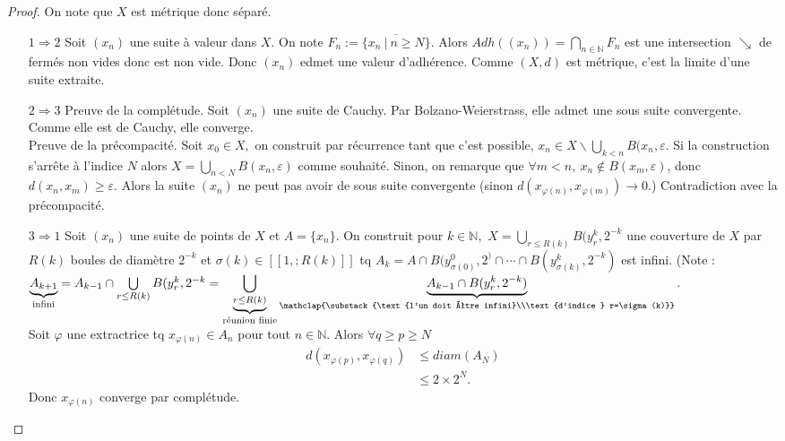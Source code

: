 \begin{proof}
    On note que $X$ est métrique donc séparé.
    \begin{itemize}
    \item[$1\Rightarrow 2$] Soit $(x_n)$ une suite à valeur dans $X.$ On note $F_n:=\overline{\{x_n\ |\ n\ge N\}} $. Alors $Adh((x_n))=\bigcap\limits_{n\in \mathbb{N} } F_n$ est une intersection $\searrow$ de fermés non vides donc est non vide. Donc $(x_{n})$ edmet une valeur d'adhérence. Comme $(X,d)$ est métrique, c'est la limite d'une suite extraite.
    \item[ $2\Rightarrow 3$] Preuve de la complétude. Soit $(x_{n})$ une suite de Cauchy. Par Bolzano-Weierstrass, elle admet une sous suite convergente. Comme elle est de Cauchy, elle converge.\\
        Preuve de la précompacité. Soit $x_0\in X,$ on construit par récurrence tant que c'est possible, $x_{n}\in X\backslash \bigcup\limits_{k<n} B(x_{n},\varepsilon $. Si la construction s'arrête à l'indice $N$ alors $X=\bigcup\limits_{n<N} B(x_{n},\varepsilon )$ comme souhaité. Sinon, on remarque que $\forall m<n,\ x_{n}\not\in B(x_m,\varepsilon ) $, donc $d(x_{n},x_m)\ge \varepsilon .$ Alors la suite $(x_{n})$ ne peut pas avoir de sous suite convergente (sinon $d(x _{\varphi (n)},x_{\varphi (m)})\to 0.$) Contradiction avec la précompacité.
    \item[$3\Rightarrow 1$] Soit $(x_{n})$ une suite de points de $X$ et $A=\{x_{n}\} $. On construit pour  $k\in \mathbb{N} ,$ $X=\bigcup\limits_{r\le R(k)} B(y_r^k,2^{-k}$ une couverture de $X$ par $R(k)$ boules de diamètre $2^{-k}$ et $\sigma(k)\in [\![1,;R(k)]\!]$ tq $A_k=A\cap B(y^0_{\sigma(0)},2^ ) \cap \cdots\cap B(y^k_{\sigma(k)},2^{-k})$ est infini. (Note : $\underbrace{A_{k+1}}_{\text{infini}}=A_{k-1}\cap \bigcup\limits_{r\le R(k)} B(y^k_r,2^{-k}=\underbrace{\bigcup\limits_{r\le R(k)}}_{\text{réunion finie}}\underbrace{A_{k-1}\cap B(y^k_r, 2^{-k})}_{\mathclap{\substack{\text{l'un doit être infini}\\\text{d'indice } r=\sigma(k)}}} $.\\
        Soit $\varphi $ une extractrice tq $x_{\varphi (n)}\in A_n$ pour tout $n\in \mathbb{N} .$ Alors $\forall q\ge p\ge N$
        \begin{align*}
            d(x_{\varphi (p)},x_{\varphi (q)}) &\le diam(A_N)\\
                                               &\le 2\times 2^N.
        \end{align*}
        Donc $x_{\varphi (n)}$ converge par complétude.

\end{itemize}
\end{proof}
